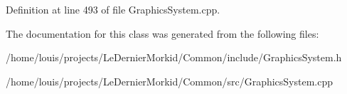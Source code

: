 Definition at line 493 of file Graphics\+System.\+cpp.



The documentation for this class was generated from the following files\+:\begin{DoxyCompactItemize}
\item 
/home/louis/projects/\+Le\+Dernier\+Morkid/\+Common/include/Graphics\+System.\+h\item 
/home/louis/projects/\+Le\+Dernier\+Morkid/\+Common/src/Graphics\+System.\+cpp\end{DoxyCompactItemize}
